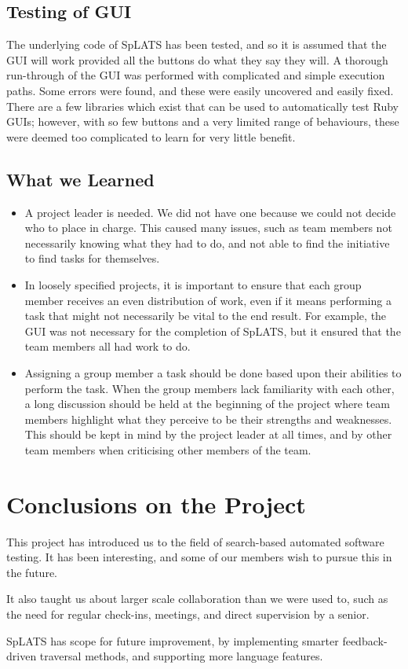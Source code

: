 \subsection{Testing of GUI}
The underlying code of SpLATS has been tested, and so it is assumed that the GUI will work provided all the buttons do what they say they will.
A thorough run-through of the GUI was performed with complicated and simple execution paths. Some errors were found, and these were easily uncovered and easily fixed.
There are a few libraries which exist that can be used to automatically test Ruby GUIs; however, with so few buttons and a very limited range of behaviours, these were deemed too complicated to learn for very little benefit.

\subsection{What we Learned}
\begin{itemize}
  \item A project leader is needed. We did not have one because we could not decide who to place in charge. This caused many issues, such as team members not necessarily knowing what they had to do, and not able to find the initiative to find tasks for themselves.
  \item In loosely specified projects, it is important to ensure that each group member receives an even distribution of work, even if it means performing a task that might not necessarily be vital to the end result. For example, the GUI was not necessary for the completion of SpLATS, but it ensured that the team members all had work to do.
  \item Assigning a group member a task should be done based upon their abilities to perform the task. When the group members lack familiarity with each other, a long discussion should be held at the beginning of the project where team members highlight what they perceive to be their strengths and weaknesses. This should be kept in mind by the project leader at all times, and by other team members when criticising other members of the team.
\end{itemize}

\section{Conclusions on the Project}
This project has introduced us to the field of search-based automated software testing.
It has been interesting, and some of our members wish to pursue this in the future.

It also taught us about larger scale collaboration than we were used to, such as the need for regular check-ins, meetings, and direct supervision by a senior.

SpLATS has scope for future improvement, by implementing smarter feedback-driven traversal methods, and supporting more language features.
